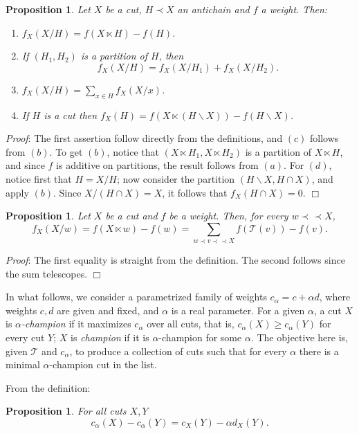 \documentclass[12pt]{article}
\newenvironment{proof}{
  {\noindent\em Proof\/}:}{\hfill$\Box$\vspace{3 mm}}
\newtheorem{pro}[lem]{Proposition}
\newcommand{\T}{\ensuremath{\mathcal{T}}\xspace}
\newcommand{\al}{\ensuremath{\alpha}\xspace}
\newcommand{\ccal}{\ensuremath{c_\alpha}\xspace}
\newcommand{\bip}{\prec\!\!\prec}
\newcommand{\lt}[2]{\ensuremath{#1\!\!\ltimes\!\!#2}}
\begin{document}
\begin{pro}\label{pro:prune}
  Let \(X\) be a cut, \(H\prec X\) an antichain and \(f\) a weight. Then:
  \begin{enumerate}
      \item \(f_X(X/H) = f(\lt{X}{H})-f(H)\).
      \item If \((H_1,H_2)\) is a partition of \(H\), then
      \[
        f_X(X/H)=f_X(X/H_1)+f_X(X/H_2).
      \]
      \item \(f_X(X/H) = \sum_{x\in H}f_X(X/x)\).
      \item If \(H\) is a cut then \(f_X(H) = f(\lt{X}{(H\backslash X)})-f(H\backslash X)\).
  \end{enumerate}
\end{pro}
\begin{proof}
  The first assertion follow directly from the definitions, and \((c)\)
  follows from \((b)\).  To get \((b)\), notice that
  \((\lt{X}{H_1},\lt{X}{H_2})\) is a partition of \(\lt{X}{H}\), and since
  \(f\) is additive on partitions, the result follows from \((a)\).  For
  \((d)\), notice first that \(H = X/H\); now consider the partition
  \((H\backslash X, H\cap X)\), and apply \((b)\).  Since \(X/(H\cap X) = X\),
  it follows that \(f_X(H\cap X)=0\).
\end{proof}

\begin{pro}\label{pro:telescope}
  Let \(X\) be a cut and \(f\) be a weight.  Then, for every \(w\bip X\),
  \[
    f_X(X/w) = f(\lt{X}{w}) - f(w) = \sum_{w\prec v\bip X}f(\T(v))-f(v).
  \]
\end{pro}
\begin{proof}
  The first equality is straight from the definition.  The second follows
  since the sum telescopes.
\end{proof}

In what follows, we consider a parametrized family of weights
\(\ccal=c+\al d\), where weights \(c,d\) are given and fixed, and \al is a
real parameter.  For a given \al, a cut \(X\) is \emph{\al-champion} if it
maximizes \ccal over all cuts, that is, \(\ccal(X)\geq\ccal(Y)\) for every cut
\(Y\); \(X\) is \emph{champion} if it is \al-champion for some \al.  The
objective here is, given \T and \ccal, to produce a collection of cuts such
that for every \al there is a minimal \al-champion cut in the list.

From the definition:

\begin{pro}\label{pro:dif}
  For all cuts \(X, Y\)
  \[
    \ccal(X) - \ccal(Y) = c_X(Y) - \al d_X(Y).
  \]
\end{pro}
\end{document}
